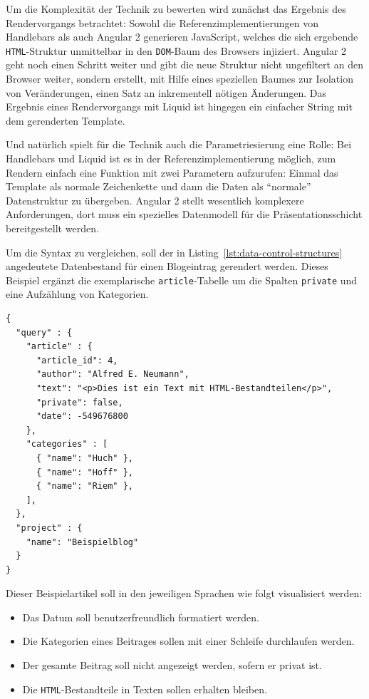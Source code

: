 Um die Komplexität der Technik zu bewerten wird zunächst das Ergebnis des Rendervorgangs betrachtet: Sowohl die Referenzimplementierungen von Handlebars als auch Angular 2 generieren JavaScript, welches die sich ergebende \texttt{HTML}-Struktur unmittelbar in den \texttt{DOM}-Baum des Browsers injiziert. Angular 2 geht noch einen Schritt weiter und gibt die neue Struktur nicht ungefiltert an den Browser weiter, sondern erstellt, mit Hilfe eines speziellen Baumes zur Isolation von Veränderungen, einen Satz an inkrementell nötigen Änderungen. Das Ergebnis eines Rendervorgangs mit Liquid ist hingegen ein einfacher String mit dem gerenderten Template.

Und natürlich spielt für die Technik auch die Parametriesierung eine Rolle: Bei Handlebars und Liquid ist es in der Referenzimplementierung möglich, zum Rendern einfach eine Funktion mit zwei Parametern aufzurufen: Einmal das Template als normale Zeichenkette und dann die Daten als "`normale"' Datenstruktur zu übergeben. Angular 2 stellt wesentlich komplexere Anforderungen, dort muss ein spezielles Datenmodell für die Präsentationsschicht bereitgestellt werden.

Um die Syntax zu vergleichen, soll der in Listing~\ref{lst:data-control-structures} angedeutete Datenbestand für einen Blogeintrag gerendert werden. Dieses Beispiel ergänzt die exemplarische \texttt{article}-Tabelle um die Spalten \texttt{private} und eine Aufzählung von Kategorien.

\begin{lstlisting}[float=h!,caption={JSON-Darstellung eines exemplarischen Datenbestandes}, label={lst:data-control-structures}]
{
  "query" : {
    "article" : {
      "article_id": 4,
      "author": "Alfred E. Neumann",
      "text": "<p>Dies ist ein Text mit HTML-Bestandteilen</p>",
      "private": false,
      "date": -549676800
    },
    "categories" : [
      { "name": "Huch" },
      { "name": "Hoff" },
      { "name": "Riem" },
    ],
  },
  "project" : {
    "name": "Beispielblog"
  }
}
\end{lstlisting}

Dieser Beispielartikel soll in den jeweiligen Sprachen wie folgt visualisiert werden:
\begin{itemize}[noitemsep]
\item Das Datum soll benutzerfreundlich formatiert werden.
\item Die Kategorien eines Beitrages sollen mit einer Schleife durchlaufen werden.
\item Der gesamte Beitrag soll nicht angezeigt werden, sofern er privat ist.
\item Die \texttt{HTML}-Bestandteile in Texten sollen erhalten bleiben.
\end{itemize}

